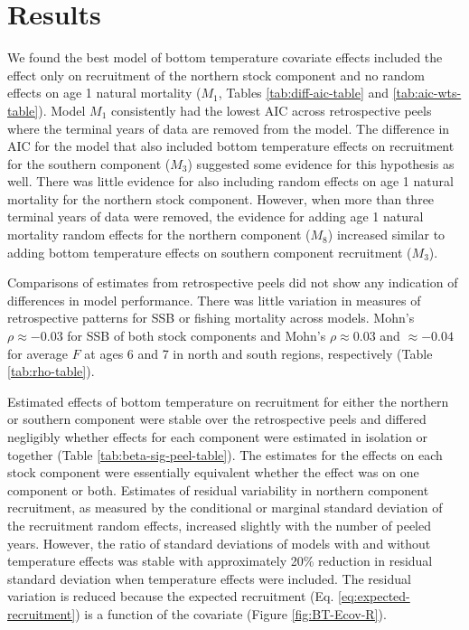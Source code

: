 \documentclass[
]{article}
\begin{document}
\hypertarget{results}{%
\section*{Results}\label{results}}

We found the best model of bottom temperature covariate effects included the effect only on recruitment of the northern stock component and no random effects on age 1 natural mortality (\(M_1\), Tables \ref{tab:diff-aic-table} and \ref{tab:aic-wts-table}). Model \(M_1\) consistently had the lowest AIC across retrospective peels where the terminal years of data are removed from the model. The difference in AIC for the model that also included bottom temperature effects on recruitment for the southern component (\(M_3\)) suggested some evidence for this hypothesis as well. There was little evidence for also including random effects on age 1 natural mortality for the northern stock component. However, when more than three terminal years of data were removed, the evidence for adding age 1 natural mortality random effects for the northern component (\(M_8\)) increased similar to adding bottom temperature effects on southern component recruitment (\(M_3\)).

Comparisons of estimates from retrospective peels did not show any indication of differences in model performance. There was little variation in measures of retrospective patterns for SSB or fishing mortality across models. Mohn's \(\rho \approx -0.03\) for SSB of both stock components and Mohn's \(\rho \approx 0.03\) and \(\approx -0.04\) for average \(F\) at ages 6 and 7 in north and south regions, respectively (Table \ref{tab:rho-table}).

Estimated effects of bottom temperature on recruitment for either the northern or southern component were stable over the retrospective peels and differed negligibly whether effects for each component were estimated in isolation or together (Table \ref{tab:beta-sig-peel-table}). The estimates for the effects on each stock component were essentially equivalent whether the effect was on one component or both. Estimates of residual variability in northern component recruitment, as measured by the conditional or marginal standard deviation of the recruitment random effects, increased slightly with the number of peeled years. However, the ratio of standard deviations of models with and without temperature effects was stable with approximately 20\% reduction in residual standard deviation when temperature effects were included. The residual variation is reduced because the expected recruitment (Eq. \ref{eq:expected-recruitment}) is a function of the covariate (Figure \ref{fig:BT-Ecov-R}).
\end{document}
